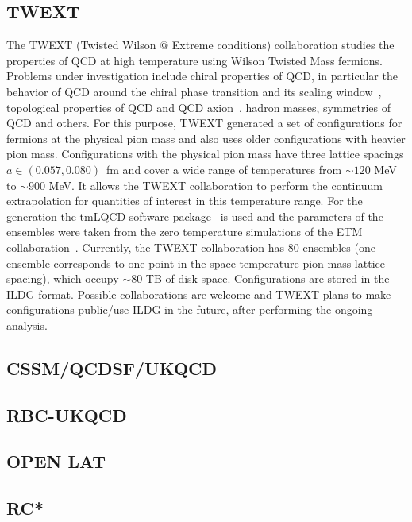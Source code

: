 \documentclass[a4paper,11pt]{article}
\begin{document}
\subsection{TWEXT}
\begin{linenumbers}[1]
The TWEXT (Twisted Wilson @ Extreme conditions) collaboration studies
the properties of QCD at high temperature using Wilson Twisted Mass
fermions. Problems under investigation include chiral properties of
QCD, in particular the behavior of QCD around the chiral phase
transition and its scaling window~\cite{Kotov:2021rah}, topological
properties of QCD and QCD axion~\cite{Kotov:2021ujj}, hadron masses,
symmetries of QCD and others. For this purpose, TWEXT generated a set
of configurations for  fermions at the physical pion mass
and also uses older configurations with heavier pion
mass. Configurations with the physical pion mass have three lattice
spacings $a\in(0.057,0.080)$~fm and cover a wide range of temperatures
from $\sim120$ MeV to $\sim900$ MeV. It allows the TWEXT collaboration
to perform the continuum extrapolation for quantities of interest in
this temperature range. For the generation the tmLQCD software
package~\cite{Jansen:2009xp,Deuzeman:2013xaa,Abdel-Rehim:2013wba} is
used and the parameters of the ensembles were taken from the zero
temperature simulations of the ETM
collaboration~\cite{Alexandrou:2018egz}. Currently, the TWEXT
collaboration has 80 ensembles (one ensemble corresponds to one point
in the space temperature-pion mass-lattice spacing), which occupy
$\sim80$ TB of disk space. Configurations are stored in the ILDG
format. Possible collaborations are welcome and TWEXT plans to make
configurations public/use ILDG in the future, after performing the
ongoing analysis.
\end{linenumbers}

\subsection{CSSM/QCDSF/UKQCD}

\subsection{RBC-UKQCD}

\subsection{OPEN LAT}

\subsection{RC*}
\end{document}
